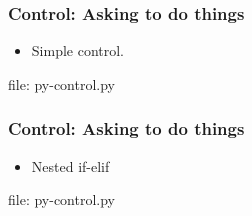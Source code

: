 \begin{frame}[fragile]
\frametitle{Control: Asking to do things}
\newcommand{\newfilename}{py-control.py}

\begin{itemize}
\item Simple control.

\end{itemize}

file: \newfilename

\end{frame}

\begin{frame}[fragile]
\frametitle{Control: Asking to do things}
\newcommand{\newfilename}{py-control.py}

\begin{itemize}
\item Nested if-elif

\end{itemize}


file: \newfilename

\end{frame}